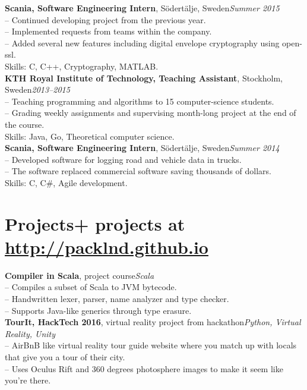 \documentclass[10pt]{article}
\begin{document}
\noindent\textbf{Scania, Software Engineering Intern}, Södertälje, Sweden\hfill\textit{Summer 2015}\\
\indent-- Continued developing project from the previous year.\\
\indent-- Implemented requests from teams within the company.\\
\indent-- Added several new features including digital envelope cryptography using open-ssl.\\
\indent Skills: C, C++, Cryptography, MATLAB. \\

\noindent\textbf{KTH Royal Institute of Technology, Teaching Assistant}, Stockholm, Sweden\hfill\textit{2013--2015}\\
\indent-- Teaching programming and algorithms to 15 computer-science students.\\
\indent-- Grading weekly assignments and supervising month-long project at the end of the course. \\
\indent Skills: Java, Go, Theoretical computer science. \\

\noindent\textbf{Scania, Software Engineering Intern}, Södertälje, Sweden\hfill\textit{Summer 2014}\\
\indent-- Developed software for logging road and vehicle data in trucks.\\
\indent-- The software replaced commercial software saving thousands of dollars.\\
\indent Skills: C, C\#, Agile development.\\

\section*{Projects\hfill {\normalsize{}+ projects at \url{http://packlnd.github.io}}}
\vspace{0.1em}
\hline
\vspace{0.3em}
\noindent\textbf{Compiler in Scala}, project course\hfill\textit{Scala}\\
\indent-- Compiles a subset of Scala to JVM bytecode.\\
\indent-- Handwritten lexer, parser, name analyzer and type checker.\\
\indent-- Supports Java-like generics through type erasure.\\

\noindent\textbf{TourIt, HackTech 2016}, virtual reality project from hackathon\hfill \textit{Python, Virtual Reality, Unity} \\
\indent-- AirBnB like virtual reality tour guide website where you match up with locals that give you a tour of their city.\\
\indent-- Uses Oculus Rift and 360 degrees photosphere images to make it seem like you're there.\\
\end{document}
